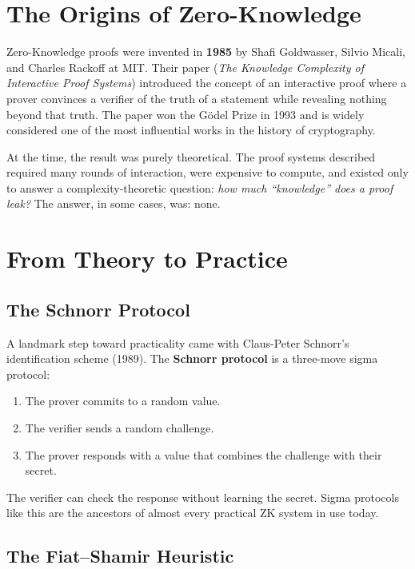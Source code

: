 
\section{The Origins of Zero-Knowledge}

Zero-Knowledge proofs were invented in \textbf{1985} by Shafi Goldwasser, Silvio Micali, and Charles Rackoff at MIT. Their paper (\textit{The Knowledge Complexity of Interactive Proof Systems}) introduced the concept of an interactive proof where a prover convinces a verifier of the truth of a statement while revealing nothing beyond that truth. The paper won the Gödel Prize in 1993 and is widely considered one of the most influential works in the history of cryptography.

At the time, the result was purely theoretical. The proof systems described required many rounds of interaction, were expensive to compute, and existed only to answer a complexity-theoretic question: \emph{how much ``knowledge'' does a proof leak?} The answer, in some cases, was: none.

\section{From Theory to Practice}

\subsection*{The Schnorr Protocol}

A landmark step toward practicality came with Claus-Peter Schnorr's identification scheme (1989). The \textbf{Schnorr protocol} is a three-move sigma protocol:

\begin{enumerate}
  \item The prover commits to a random value.
  \item The verifier sends a random challenge.
  \item The prover responds with a value that combines the challenge with their secret.
\end{enumerate}

The verifier can check the response without learning the secret. Sigma protocols like this are the ancestors of almost every practical ZK system in use today.

\subsection*{The Fiat--Shamir Heuristic}

